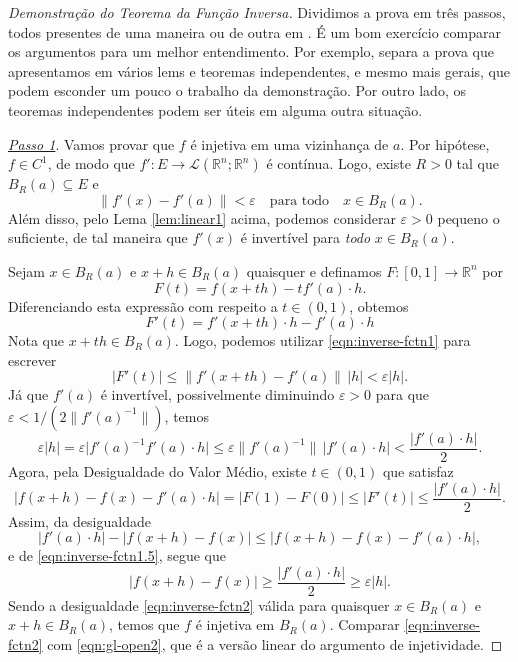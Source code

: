\begin{proof}[Demonstração do Teorema da Função Inversa]
	Dividimos a prova em três passos, todos presentes de uma maneira ou de outra em \cite{Lima-13,Rudi-64,Spiv-65}. É um bom exercício comparar os argumentos para um melhor entendimento. Por exemplo, \cite{Lima-13} separa a prova que apresentamos em vários lems e teoremas independentes, e mesmo mais gerais, que podem esconder um pouco o trabalho da demonstração. Por outro lado, os teoremas independentes podem ser úteis em alguma outra situação.
	
	\smallskip
	
	\underline{\textit{Passo 1}}. Vamos provar que $f$ é injetiva em uma vizinhança de $a$. Por hipótese, $f \in C^1$, de modo que $f':E \to \mathcal{L}(\mathbb{R}^n;\mathbb{R}^n)$ é contínua. Logo, existe $R > 0$ tal que $B_R(a) \subseteq E$ e
	\begin{equation}\label{eqn:inverse-fctn1}
	\|f'(x) - f'(a)\| < \varepsilon \quad \text{para todo} \quad x \in B_R(a).
	\end{equation} Além disso, pelo Lema \ref{lem:linear1} acima, podemos considerar $\varepsilon> 0$ pequeno o suficiente, de tal maneira que $f'(x)$ é invertível para \textit{todo} $x \in B_R(a)$.
	
	Sejam $x \in B_R(a)$ e $x+h \in B_R(a)$ quaisquer e definamos $F: [0,1] \to \mathbb{R}^n$ por
	\[
	F(t) = f(x + th) - t f'(a) \cdot h.
	\] Diferenciando esta expressão com respeito a $t \in (0,1)$, obtemos
	\[
	F'(t) = f'(x + th) \cdot h - f'(a) \cdot h
	\]
	Nota que $x + th \in B_R(a)$. Logo, podemos utilizar \eqref{eqn:inverse-fctn1} para escrever
	\[
	\big| F'(t) \big| \le \big\| f'(x + th) - f'(a) \big\| \, |h| < \varepsilon |h|.
	\] Já que $f'(a)$ é invertível, possivelmente diminuindo $\varepsilon > 0$ para que $\varepsilon < 1/(2\|f'(a)^{-1}\|)$, temos
	\begin{equation}\label{eqn:inverse-fctn1.5}
	\varepsilon |h| = \varepsilon \big|f'(a)^{-1} f'(a) \cdot h\big| \le \varepsilon \|f'(a)^{-1}\| \, |f'(a) \cdot h| < \frac{|f'(a) \cdot h|}{2}.
	\end{equation}
	Agora, pela Desigualdade do Valor Médio, existe $t \in (0,1)$ que satisfaz
	\[
	\big| f(x+h) - f(x) - f'(a)\cdot h \big| = \big| F(1) - F(0) \big| \le \big|F'(t)\big| \le \frac{|f'(a) \cdot h|}{2}.
	\] Assim, da desigualdade
	\[
	\big| f'(a)\cdot h \big| - \big| f(x+h) - f(x)\big| \le \big| f(x+h) - f(x) - f'(a)\cdot h \big|,
	\] e de \eqref{eqn:inverse-fctn1.5}, segue que 
	\begin{equation}\label{eqn:inverse-fctn2}
	\big| f(x+h) - f(x)\big| \ge \frac{|f'(a) \cdot h|}{2} \ge \varepsilon |h|.
	\end{equation}  Sendo a desigualdade \eqref{eqn:inverse-fctn2} válida para quaisquer $x \in B_R(a)$ e $x + h \in B_R(a)$, temos que $f$ é injetiva em $B_R(a)$. Comparar \eqref{eqn:inverse-fctn2} com \eqref{eqn:gl-open2}, que é a versão linear do argumento de injetividade.
	

\end{proof}
